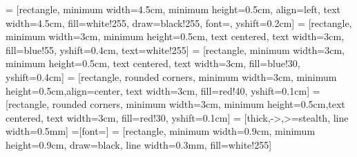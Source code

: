 \documentclass[]{article}
\begin{document}

 = [rectangle, minimum width=4.5cm, minimum height=0.5cm, align=left, text width=4.5cm, fill=white!255, draw=black!255, font=\small, yshift=0.2cm]
 = [rectangle, minimum width=3cm, minimum height=0.5cm, text centered, text width=3cm, fill=blue!55, yshift=0.4cm, text=white!255]
 = [rectangle, minimum width=3cm, minimum height=0.5cm, text centered, text width=3cm, fill=blue!30, yshift=0.4cm]
 = [rectangle, rounded corners, minimum width=3cm, minimum height=0.5cm,align=center, text width=3cm, fill=red!40, yshift=0.1cm]
 = [rectangle, rounded corners, minimum width=3cm, minimum height=0.5cm,text centered, text width=3cm, fill=red!30, yshift=0.1cm]
 = [thick,->,>=stealth, line width=0.5mm]
=[font=\scriptsize]
 = [rectangle, minimum width=0.9cm, minimum height=0.9cm, draw=black, line width=0.3mm, fill=white!255]
\end{document}
